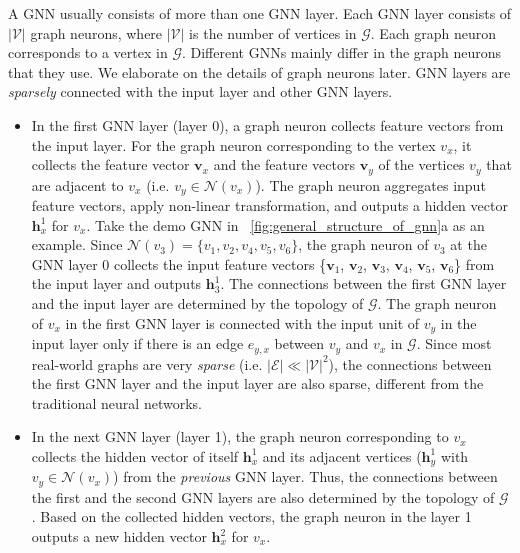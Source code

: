 A GNN usually consists of more than one GNN layer.
%
Each GNN layer consists of $|\mathcal{V}|$ graph neurons, where $|\mathcal{V}|$ is the number of vertices in $\mathcal{G}$.
%
Each graph neuron corresponds to a vertex in $\mathcal{G}$.
%
Different GNNs mainly differ in the graph neurons that they use.
%
We elaborate on the details of graph neurons later.
%
GNN layers are \emph{sparsely} connected with the input layer and other GNN layers.
%
\begin{itemize}
    \item In the first GNN layer (layer 0), a graph neuron collects feature vectors from the input layer.
    For the graph neuron corresponding to the vertex $v_x$, it collects the feature vector $\boldsymbol{v}_x$ and the feature vectors $\boldsymbol{v}_y$ of the vertices $v_y$ that are adjacent to $v_x$ (i.e.  $v_y \in \mathcal{N}(v_x)$).
    The graph neuron aggregates input feature vectors, apply non-linear transformation, and outputs a hidden vector $\boldsymbol{h}^1_x$ for $v_x$.
    Take the demo GNN in \figurename~\ref{fig:general_structure_of_gnn}a as an example.
    Since $\mathcal{N}(v_3) = \{v_1, v_2, v_4, v_5, v_6\}$, the graph neuron of $v_3$ at the GNN layer 0 collects the input feature vectors \{$\boldsymbol{v}_1$, $\boldsymbol{v}_2$, $\boldsymbol{v}_3$, $\boldsymbol{v}_4$, $\boldsymbol{v}_5$, $\boldsymbol{v}_6$\} from the input layer and outputs $\boldsymbol{h}^1_3$.
    The connections between the first GNN layer and the input layer  are determined by the topology of $\mathcal{G}$.
    The graph neuron of $v_x$ in the first GNN layer is connected with the input unit of $v_y$  in the input layer only if there is an edge $e_{y,x}$ between $v_y$ and $v_x$ in $\mathcal{G}$.
    Since most real-world graphs are very \emph{sparse} (i.e. $|\mathcal{E}| \ll |\mathcal{V}|^2$), the connections between the first GNN layer and the input layer are also sparse, different from the traditional neural networks.
    
    \item In the next GNN layer (layer 1), the graph neuron corresponding to $v_x$ collects the hidden vector of itself $\boldsymbol{h}^1_x$ and its adjacent vertices ($\boldsymbol{h}^1_y$ with $v_y \in \mathcal{N}(v_x)$) from the \emph{previous} GNN layer.
    Thus, the connections between the first and the second GNN layers are also determined by the topology of $\mathcal{G}$.
    Based on the collected hidden vectors, the graph neuron in the layer 1 outputs a new hidden vector $\boldsymbol{h}^2_x$ for $v_x$.
   

\end{itemize}
